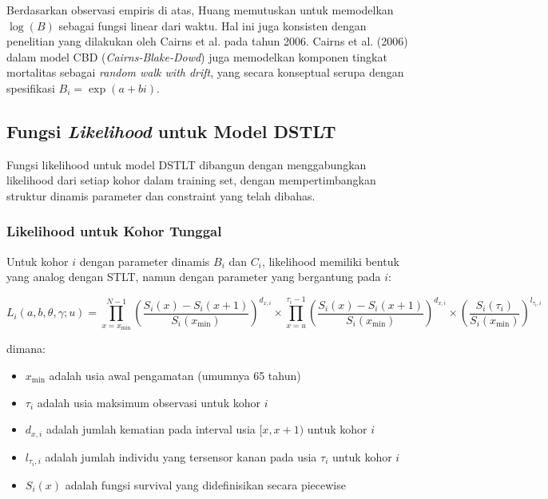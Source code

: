 Berdasarkan observasi empiris di atas, Huang memutuskan untuk memodelkan $\log(B)$ sebagai fungsi linear dari waktu. Hal ini juga konsisten dengan penelitian yang dilakukan oleh Cairns et al. pada tahun 2006. Cairns et al. (2006) dalam model CBD (\textit{Cairns-Blake-Dowd}) juga memodelkan komponen tingkat mortalitas sebagai \textit{random walk with drift}, yang secara konseptual serupa dengan spesifikasi $B_i = \exp(a + bi)$.

\subsection{Fungsi \textit{Likelihood} untuk Model DSTLT}

Fungsi likelihood untuk model DSTLT dibangun dengan menggabungkan likelihood dari setiap kohor dalam training set, dengan mempertimbangkan struktur dinamis parameter dan constraint yang telah dibahas.

\subsubsection{Likelihood untuk Kohor Tunggal}

Untuk kohor $i$ dengan parameter dinamis $B_i$ dan $C_i$, likelihood memiliki bentuk yang analog dengan STLT, namun dengan parameter yang bergantung pada $i$:

\begin{equation}
L_i(a, b, \theta, \gamma; u) = \prod_{x=x_{\min}}^{N-1} \left(\frac{S_i(x) - S_i(x+1)}{S_i(x_{\min})}\right)^{d_{x,i}} \times \prod_{x=u}^{\tau_i-1} \left(\frac{S_i(x) - S_i(x+1)}{S_i(x_{\min})}\right)^{d_{x,i}} \times \left(\frac{S_i(\tau_i)}{S_i(x_{\min})}\right)^{l_{\tau_i,i}}
\label{eq:dstlt_likelihood_single}
\end{equation}

dimana:
\begin{itemize}
\item $x_{\min}$ adalah usia awal pengamatan (umumnya 65 tahun)
\item $\tau_i$ adalah usia maksimum observasi untuk kohor $i$
\item $d_{x,i}$ adalah jumlah kematian pada interval usia $[x, x+1)$ untuk kohor $i$
\item $l_{\tau_i,i}$ adalah jumlah individu yang tersensor kanan pada usia $\tau_i$ untuk kohor $i$
\item $S_i(x)$ adalah fungsi survival yang didefinisikan secara piecewise
\end{itemize}

